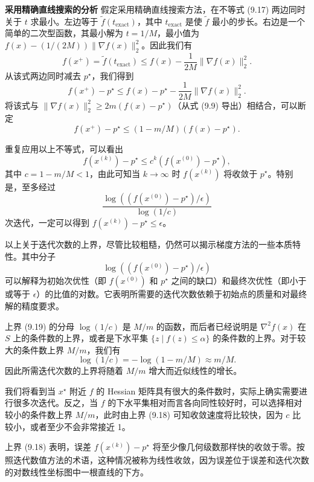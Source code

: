 \documentclass[UTF8, 12pt, fontset=fandol, oneside]{ctexart}
\begin{document}
\noindent\textbf{采用精确直线搜索的分析}\quad
假定采用精确直线搜索方法，在不等式 (9.17) 两边同时关于 $t$ 求最小。左边等于 $\tilde{f}(t_{\mathrm{exact}})$，其中 $t_{\mathrm{exact}}$ 是使 $\tilde{f}$ 最小的步长。右边是一个简单的二次型函数，其最小解为 $t=1/M$，最小值为 $f(x)-(1/(2M))\|\nabla f(x)\|_2^2$。因此我们有
\[
f(x^+)=\tilde{f}(t_{\mathrm{exact}})\leq f(x)-\frac{1}{2M}\|\nabla f(x)\|_2^2.
\]
从该式两边同时减去 $p^\star$，我们得到
\[
f(x^+)-p^\star\leq f(x)-p^\star-\frac{1}{2M}\|\nabla f(x)\|_2^2.
\]
将该式与 $\|\nabla f(x)\|_2^2\geq 2m(f(x)-p^\star)$（从式 (9.9) 导出）相结合，可以断定
\[
f(x^+)-p^\star\leq (1-m/M)(f(x)-p^\star).
\]

重复应用以上不等式，可以看出
\begin{equation}
f(x^{(k)})-p^\star\leq c^k(f(x^{(0)})-p^\star),
\tag{9.18}
\end{equation}
其中 $c=1-m/M<1$，由此可知当 $k\to\infty$ 时 $f(x^{(k)})$ 将收敛于 $p^\star$。特别是，至多经过
\begin{equation}
\frac{\log((f(x^{(0)})-p^\star)/\epsilon)}{\log(1/c)}
\tag{9.19}
\end{equation}
次迭代，一定可以得到 $f(x^{(k)})-p^\star\leq\epsilon$。

以上关于迭代次数的上界，尽管比较粗糙，仍然可以揭示梯度方法的一些本质特性。其中分子
\[
\log((f(x^{(0)})-p^\star)/\epsilon)
\]
可以解释为初始次优性（即 $f(x^{(0)})$ 和 $p^\star$ 之间的缺口）和最终次优性（即小于或等于 $\epsilon$）的比值的对数。它表明所需要的迭代次数依赖于初始点的质量和对最终解的精度要求。

上界 (9.19) 的分母 $\log(1/c)$ 是 $M/m$ 的函数，而后者已经说明是 $\nabla^2 f(x)$ 在 $S$ 上的条件数的上界，或者是下水平集 $\{z\mid f(z)\leq\alpha\}$ 的条件数的上界。对于较大的条件数上界 $M/m$，我们有
\[
\log(1/c)=-\log(1-m/M)\approx m/M.
\]
因此所需迭代次数的上界将随着 $M/m$ 增大而近似线性的增长。

我们将看到当 $x^\star$ 附近 $f$ 的 Hessian 矩阵具有很大的条件数时，实际上确实需要进行很多次迭代。反之，当 $f$ 的下水平集相对而言各向同性较好时，可以选择相对较小的条件数上界 $M/m$，此时由上界 (9.18) 可知收敛速度将比较快，因为 $c$ 比较小，或者至少不会非常接近 1。

上界 (9.18) 表明，误差 $f(x^{(k)})-p^\star$ 将至少像几何级数那样快的收敛于零。按照迭代数值方法的术语，这种情况被称为线性收敛，因为误差位于误差和迭代次数的对数线性坐标图中一根直线的下方。
\end{document}
